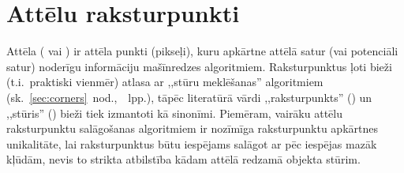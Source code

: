 \section{Attēlu raksturpunkti} \label{sec:algo}
Attēla  ( vai )
ir attēla punkti (pikseļi), kuru apkārtne attēlā 
satur (vai potenciāli satur) noderīgu informāciju mašīnredzes algoritmiem.
Raksturpunktus ļoti bieži (t.i.~praktiski vienmēr)
atlasa ar ,,stūru meklēšanas'' algoritmiem
(sk.~\ref{sec:corners}~nod.,~\pageref{sec:corners}~lpp.),
tāpēc literatūrā vārdi ,,raksturpunkts'' () un ,,stūris''
() bieži tiek izmantoti kā sinonīmi. Piemēram, vairāku attēlu
raksturpunktu salāgošanas algoritmiem ir 
nozīmīga raksturpunktu apkārtnes unikalitāte,
lai raksturpunktus būtu iespējams salāgot ar pēc iespējas mazāk kļūdām,
nevis to strikta atbilstība kādam attēlā redzamā objekta stūrim.



